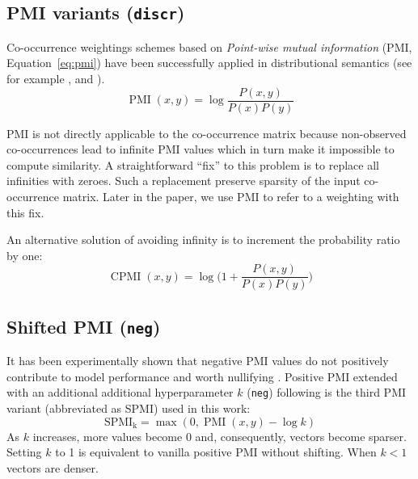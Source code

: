 \documentclass[11pt,letterpaper]{article}
\begin{document}


\subsection{PMI variants (\texttt{discr})}
\label{sec:pmi-variants}

Co-occurrence weightings schemes based on \emph{Point-wise mutual information} (PMI, Equation~\ref{eq:pmi}) have been successfully applied in distributional semantics (see for example ,  and ).
%
\begin{equation}
  \label{eq:pmi}
  \operatorname{PMI}(x, y) = \log\frac{P(x,y)}{P(x)P(y)}
\end{equation}

PMI is not directly applicable to the co-occurrence matrix because non-observed co-occurrences lead to infinite PMI values which in turn make it impossible to compute similarity. A straightforward ``fix'' to this problem is to replace all infinities with zeroes. Such a replacement preserve sparsity of the input co-occurrence matrix. Later in the paper, we use PMI to refer to a weighting with this fix.

An alternative solution of avoiding infinity is to increment the probability ratio by one:
%
\begin{equation}
  \label{eq:cpmi}
  \operatorname{CPMI}(x, y) = \log\Big( 1 + \frac{P(x,y)}{P(x)P(y)} \Big)
\end{equation}

\subsection{Shifted PMI (\texttt{neg})}
\label{sec:shifted-pmi}

It has been experimentally shown that negative PMI values do not positively contribute to model performance and worth nullifying \cite{Turney:2010:FMV:1861751.1861756}. Positive PMI extended with an additional additional hyperparameter $k$ (\texttt{neg}) following  is the third PMI variant (abbreviated as SPMI) used in this work:
%
\begin{equation}
  \label{eq:ppmi}
  \operatorname{SPMI_k} = \max (0, \operatorname{PMI}(x, y) - \log k)
\end{equation}
%
As $k$ increases, more values become 0 and, consequently, vectors become sparser. Setting $k$ to 1 is equivalent to vanilla positive PMI without shifting. When $k < 1$ vectors are denser.
\end{document}
